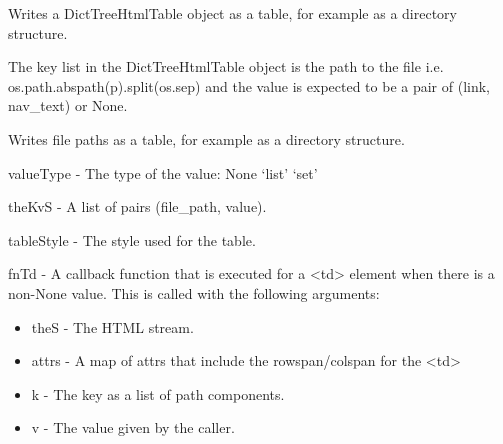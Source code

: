 \documentclass[letterpaper,10pt,english]{sphinxmanual}
\begin{document}
\begin{fulllineitems}
\label{\detokenize{ref/util/HtmlUtils:TotalDepth.util.HtmlUtils.writeDictTreeAsTable}}
Writes a DictTreeHtmlTable object as a table, for example as a directory
structure.

The key list in the DictTreeHtmlTable object is the path to the file
i.e. os.path.abspath(p).split(os.sep) and the value is expected to be a
pair of (link, nav\_text) or None.

\end{fulllineitems}


\begin{fulllineitems}
\label{\detokenize{ref/util/HtmlUtils:TotalDepth.util.HtmlUtils.writeFilePathsAsTable}}
Writes file paths as a table, for example as a directory structure.

valueType - The type of the value: None \textbar{} ‘list’ \textbar{} ‘set’

theKvS - A list of pairs (file\_path, value).

tableStyle - The style used for the table.

fnTd - A callback function that is executed for a \textless{}td\textgreater{} element when
there is a non-None value. This is called with the following arguments:
\begin{itemize}
\item {} 
theS - The HTML stream.

\item {} 
attrs - A map of attrs that include the rowspan/colspan for the \textless{}td\textgreater{}

\item {} 
k - The key as a list of path components.

\item {} 
v - The value given by the caller.

\end{itemize}

\end{fulllineitems}
\end{document}
